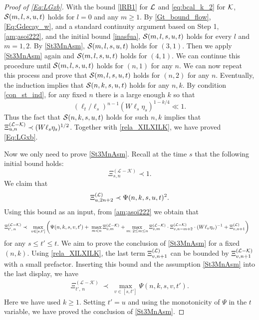 \documentclass[10pt,reqno]{article}
\theoremstyle{plain} %
\theoremstyle{remark}
\numberwithin{equation}{section}
\begin{document}
\begin{proof}[Proof of \eqref{Eq:LGxb}]
With the bound \eqref{lRB1} for $\cal L$ and \eqref{eq:bcal_k_2} for $\cal K$, 
${\cal S}(m, l,s,u,t)$  holds for $l=0$ and any  $m\ge 1$. 
By \eqref{Gt_bound_flow}, \eqref{Eq:Gdecay_w}, and a standard continuity argument based on Step 1, \eqref{am;asoi222}, and the initial bound \eqref{inasfua}, 
${\cal S}(m, l,s,u,t)$ holds for every $l$ and $m=1,2$. By \eqref{St3MnAsm}, ${\cal S}(m, l,s,u,t)$ holds for $(3, 1)$. 
Then we apply  \eqref{St3MnAsm} again and ${\cal S}(m, l,s,u,t)$ holds for $(4, 1)$. We can continue this procedure until 
${\cal S}(m, l,s,u,t)$ holds for  $(n, 1)$ for any $n$. We can now repeat this process and prove that ${\cal S}(m, l,s,u,t)$ holds for  $(n, 2)$ for any $n$. Eventually, the induction implies that ${\cal S}(n,k,s,u,t)$ holds for any $n,k$. 
By   condition \eqref{con_st_ind}, for any fixed $n$  there is a large enough $k$ so that 
$$
 (\ell_t/\ell_s)^{n-1}(W\ell_s\eta_s)^{1 -k/4} \ll  1.
$$
Thus the fact that $ {\cal S}(n,k,s,u,t)$ holds for such $n, k$ implies that 
$\Xi^{({\cal L-K})}_{ u,n}\prec (W\ell_s\eta_s)^{1/2}$. Together with   \eqref{rela_XILXILK}, we have proved   \eqref{Eq:LGxb}. 

Now we only need to prove \eqref{St3MnAsm}. Recall 
at the time $s$ that the following initial bound holds: 
\begin{equation}\label{inasfua}
    \Xi_{s,n }^{(\mathcal{L}-\mathcal{K})} \prec 1.
\end{equation}
We claim that 
 \begin{align} \label{xiu2n+2psi}
    \Xi^{({\cal L})}_{u, 2n+2}
 \prec \Psi(n,k,s,u,t)^2.
\end{align}
Using  this bound as an input, from  \eqref{am;asoi222} we obtain that 
\begin{align} \label{sadui_w0}
 \Xi_{t',\,n }^{(\mathcal{L}-\mathcal{K})}  \prec\;  &\; \max_{v\in [s,t']}
  \left(\Psi(n,k,s,v,t')+\; \max_{m<n }\Xi^{({\cal L-\cal K})}_{v,m}+\max_{m:\;2\le m\le n }\Xi^{({\cal L-\cal K})}_{v,m}\cdot \Xi^{({\cal L-\cal K})}_{v,n-m+2}\cdot(W\ell_v\eta_v)^{-1}+\Xi^{({\cal L})}_{v,n+1}\right)
 \end{align}
 for any $s \le t' \le t$.  We aim to prove the conclusion of  \eqref{St3MnAsm} for a fixed $(n, k)$.  Using \eqref{rela_XILXILK}, the last term $ \Xi^{({\cal L})}_{v,n+1}$ can be bounded by $ \Xi^{({\cal L}-{\cal K})}_{v,n+1}$ with a  small prefactor.  
Inserting  this  bound and the assumption \eqref{St3MnAsm} into the last display,  we have 
\begin{align}\label{sadui-w}
    \Xi_{t',\,n }^{(\mathcal{L}-\mathcal{K})} \; \prec\; \max_{v\in[s,t']}\Psi(n,k ,s,v,t').
\end{align}
Here we have used $k\ge 1$.  Setting $t'=u$ and using the monotonicity of $\Psi$ in the $t$ variable, we have proved  the conclusion of  \eqref{St3MnAsm}. 


\end{proof}
\end{document}
